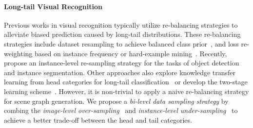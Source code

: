 \paragraph{Long-tail Visual Recognition}
Previous works in visual recognition typically utilize re-balancing strategies to alleviate biased prediction caused by long-tail distributions.
These re-balancing strategies include dataset resampling to achieve balanced class prior~\cite{chawla_smote_2002, drummond_why_2003, shen_relay_2016, mahajan_exploring_2018}, and loss re-weighting based on instance frequency or hard-example mining~\cite{cao_learning_2019, cui_class-balanced_2019, khan_cost_2017, tan_equalization_2020, lin_focal_2017, ssd_liu_2015, li2020overcoming, lu_gridrcnn_2018}. 
Recently, \cite{hu_learning_2020,gupta_lvis:_2019} propose an instance-level re-sampling strategy for the tasks of object detection and instance segmentation.
Other approaches also explore knowledge transfer learning from head categories for long-tail classification~\cite{liu_largescale_2019, gidaris_dynamic_2018} or develop the two-stage learning scheme~\cite{zhou_bbn_nodate, kang2019decoupling}. 
However, it is non-trivial to apply a naive re-balancing strategy for scene graph generation.
We propose a \textit{bi-level data sampling strategy} by combing the \textit{image-level over-sampling}~\cite{gupta_lvis:_2019} and \textit{instance-level under-sampling}~\cite{hu_learning_2020}  to achieve a better trade-off between the head and tail categories.




